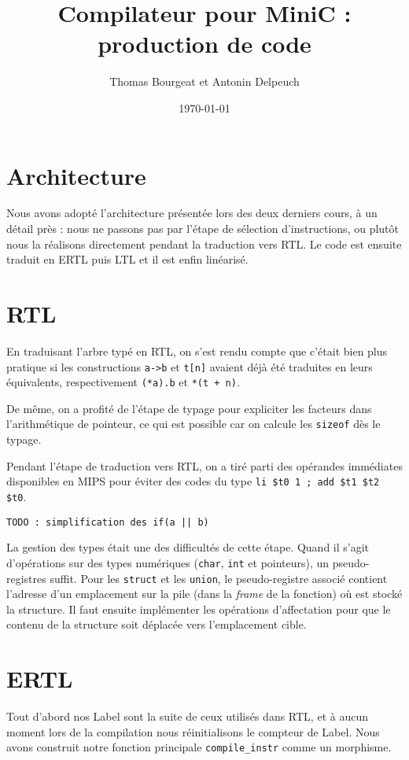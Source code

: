 \documentclass[a4paper]{article}
\begin{document}
\title{Compilateur pour MiniC : production de code}
\author{Thomas Bourgeat et Antonin Delpeuch}
\date{\today}

\maketitle

\section{Architecture}

Nous avons adopté l'architecture présentée lors des deux derniers cours, à un détail près :
nous ne passons pas par l'étape de sélection d'instructions, ou plutôt nous la réalisons
directement pendant la traduction vers RTL. Le code est ensuite traduit en ERTL puis LTL et
il est enfin linéarisé.

\section{RTL}

En traduisant l'arbre typé en RTL, on s'est rendu compte que c'était bien plus pratique si
les constructions \texttt{a->b} et \texttt{t[n]} avaient déjà été traduites en leurs équivalents,
respectivement \texttt{(*a).b} et \texttt{*(t + n)}.

De même, on a profité de l'étape de typage pour expliciter les facteurs dans l'arithmétique de pointeur,
ce qui est possible car on calcule les \texttt{sizeof} dès le typage.

Pendant l'étape de traduction vers RTL, on a tiré parti des opérandes immédiates disponibles en MIPS
pour éviter des codes du type \texttt{li  \$t0 1 ; add \$t1 \$t2 \$t0}.

\texttt{TODO : simplification des if(a || b)}

La gestion des types était une des difficultés de cette étape. Quand il s'agit d'opérations sur des types
numériques (\texttt{char}, \texttt{int} et pointeurs), un pseudo-registres suffit. Pour les \texttt{struct}
et les \texttt{union}, le pseudo-registre associé contient l'adresse d'un emplacement sur la pile (dans la
\emph{frame} de la fonction) où est stocké la structure. Il faut ensuite implémenter les opérations
d'affectation pour que le contenu de la structure soit déplacée vers l'emplacement cible.

\section{ERTL}
Tout d'abord nos Label sont la suite de ceux utilisés dans RTL, et à
aucun moment lors de la compilation nous réinitialisons le compteur de
Label. Nous avons construit notre fonction principale
\texttt{compile\_instr} comme un morphisme.
\end{document}
